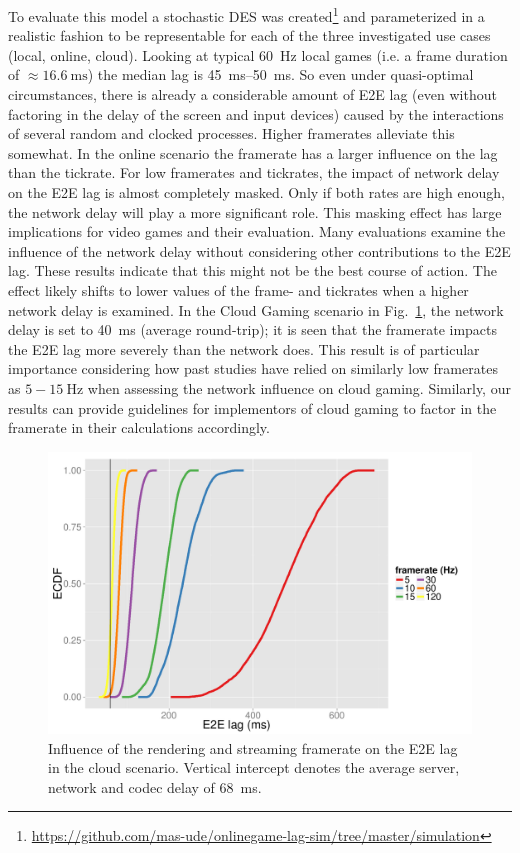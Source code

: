 To evaluate this model a stochastic \gls{DES} was created\footnote{\url{https://github.com/mas-ude/onlinegame-lag-sim/tree/master/simulation}} and parameterized in a realistic fashion to be representable for each of the three investigated use cases (local, online, cloud). Looking at typical \SI{60}{\hertz} local games (i.e. a frame duration of $\approx \SI{16.6}{\milli\second}$) the median lag is \SIrange{45}{50}{\milli\second}. So even under quasi-optimal circumstances, there is already a considerable amount of \gls{E2E} lag (even without factoring in the delay of the screen and input devices) caused by the interactions of several random and clocked processes. Higher framerates alleviate this somewhat. In the online scenario the framerate has a larger influence on the lag than the tickrate. For low framerates and tickrates, the impact of network delay on the \gls{E2E} lag is almost completely masked. Only if both rates are high enough, the network delay will play a more significant role. This masking effect has large implications for video games and their evaluation. Many evaluations examine the influence of the network delay without considering other contributions to the \gls{E2E} lag. These results indicate that this might not be the best course of action. The effect likely shifts to lower values of the frame- and tickrates when a higher network delay is examined. In the Cloud Gaming scenario in Fig.~\ref{fig:cloud-e2e-delay-sim}, the network delay is set to \SI{40}{\milli\second} (average round-trip); it is seen that the framerate impacts the \gls{E2E} lag more severely than the network does. This result is of particular importance considering how past studies have relied on similarly low framerates as $5-\SI{15}{\hertz}$ when assessing the network influence on cloud gaming. Similarly, our results can provide guidelines for implementors of cloud gaming to factor in the framerate in their calculations accordingly.

\begin{figure}[!t]
	\centering
	\includegraphics[width=1.0\columnwidth]{../../../simulation/visualization/cloudgaming-lag-cdf.pdf}
	\caption{Influence of the rendering and streaming framerate on the \gls{E2E} lag in the cloud scenario. Vertical intercept denotes the average server, network and codec delay of \SI{68}{\milli\second}.}
\label{fig:cloud-e2e-delay-sim}
\end{figure}


